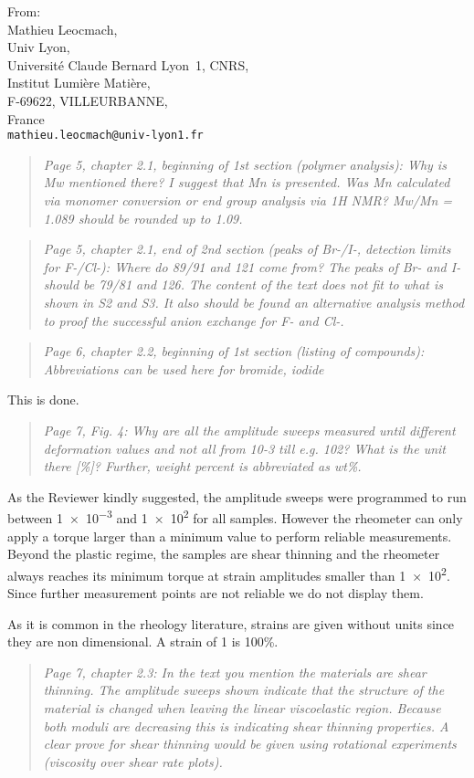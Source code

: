 \documentclass[a4paper, parskip=true, firsthead=false, fromemail=true, foldmarks=false]{scrlttr2}
\newenvironment{quotationi}
{\begin{quotation}\itshape}
{\end{quotation}}
\begin{document}
\begin{letter}{From:\\
Mathieu Leocmach,\\
Univ Lyon,\\ 
Universit\'e Claude Bernard Lyon~1, CNRS,\\
Institut Lumi\`ere Mati\`ere,\\
F-69622, VILLEURBANNE,\\
France\\
\texttt{mathieu.leocmach@univ-lyon1.fr}
}
\begin{quotationi}
Page 5, chapter 2.1, beginning of 1st section (polymer analysis): Why is Mw mentioned there? I suggest that Mn is presented. Was Mn calculated via monomer conversion or end group analysis via 1H NMR? Mw/Mn = 1.089 should be rounded up to 1.09.
\end{quotationi}

\begin{quotationi}
Page 5, chapter 2.1, end of 2nd section (peaks of Br-/I-, detection limits for F-/Cl-): Where do 89/91 and 121 come from? The peaks of Br- and I- should be 79/81 and 126. The content of the text does not fit to what is shown in S2 and S3. It also should be found an alternative analysis method to proof the successful anion exchange for F- and Cl-.
\end{quotationi}

\begin{quotationi}
Page 6, chapter 2.2, beginning of 1st section (listing of compounds): Abbreviations can be used here for bromide, iodide 
\end{quotationi}

This is done.

\begin{quotationi}
Page 7, Fig. 4: Why are all the amplitude sweeps measured until different deformation values and not all from 10-3 till e.g. 102? What is the unit there [\%]? Further, weight percent is abbreviated as wt\%.
\end{quotationi}

As the Reviewer kindly suggested, the amplitude sweeps were programmed to run between \num{1e-3} and \num{1e2} for all samples. However the rheometer can only apply a torque larger than a minimum value to perform reliable measurements. Beyond the plastic regime, the samples are shear thinning and the rheometer always reaches its minimum torque at strain amplitudes smaller than \num{1e2}. Since further measurement points are not reliable we do not display them.

As it is common in the rheology literature, strains are given without units since they are non dimensional. A strain of 1 is 100\%.

\begin{quotationi}
Page 7, chapter 2.3: In the text you mention the materials are shear thinning. The amplitude sweeps shown indicate that the structure of the material is changed when leaving the linear viscoelastic region. Because both moduli are decreasing this is indicating shear thinning properties. A clear prove for shear thinning would be given using rotational experiments (viscosity over shear rate plots).
\end{quotationi}


\end{letter}
\end{document}
